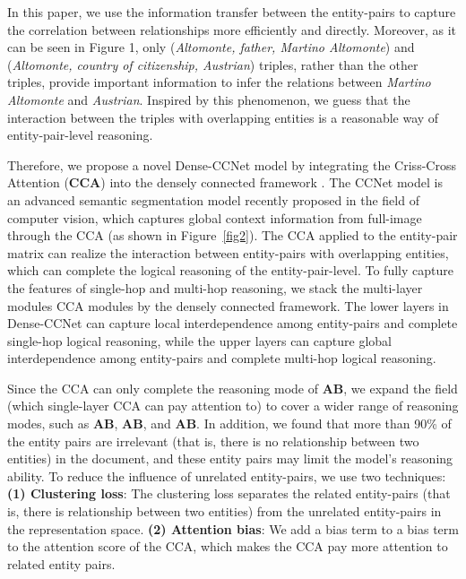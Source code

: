 \documentclass[11pt]{article}
\begin{document}
In this paper, we use the information transfer between the entity-pairs to capture the correlation between relationships more efficiently and directly.
Moreover, as it can be seen in Figure 1, only (\textit{Altomonte, father, Martino Altomonte}) and (\textit{Altomonte, country of citizenship, Austrian}) triples, rather than the other triples, provide important information to infer the relations between \textit{Martino Altomonte} and \textit{Austrian}. 
Inspired by this phenomenon, we guess that the interaction between the triples with overlapping entities is a reasonable way of entity-pair-level reasoning.

Therefore, we propose a novel Dense-CCNet model by integrating the Criss-Cross Attention (\textbf{CCA}) \cite{c:116} into the densely connected framework \cite{c:121}. 
The CCNet model \cite{c:116} is an advanced semantic segmentation model recently proposed in the field of computer vision, which captures global context information from full-image through the CCA (as shown in Figure~\ref{fig2}). 
The CCA applied to the entity-pair matrix can realize the interaction between entity-pairs with overlapping entities, which can complete the logical reasoning of the entity-pair-level. 
To fully capture the features of single-hop and multi-hop reasoning, we stack the multi-layer modules CCA modules by the densely connected framework.
The lower layers in Dense-CCNet can capture local interdependence among entity-pairs and complete single-hop logical reasoning, while the upper layers can capture global interdependence among entity-pairs and complete multi-hop logical reasoning.

Since the CCA can only complete the reasoning mode of \textbf{AB}, we expand the field (which single-layer CCA can pay attention to) to cover a wider range of reasoning modes, such as  \textbf{AB},  \textbf{AB}, and \textbf{AB}. 
In addition, we found that more than 90\% of the entity pairs are irrelevant (that is, there is no relationship between two entities) in the document, and these entity pairs may limit the model’s reasoning ability. To reduce the influence of unrelated entity-pairs, we use two techniques:
\textbf{(1) Clustering loss}: The clustering loss separates the related entity-pairs (that is, there is relationship between two entities) from the unrelated entity-pairs in the representation space.
\textbf{(2) Attention bias}: We add a bias term to a bias term to the attention score of the CCA, which makes the CCA pay more attention to related entity pairs.
\end{document}
